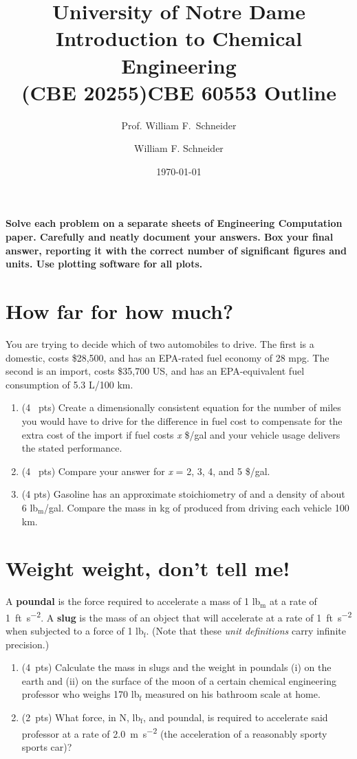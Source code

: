 \documentclass[11pt]{article}
\title{University of Notre Dame\\Introduction to Chemical Engineering\\(CBE 20255)}
\author{Prof. William F.\ Schneider}
\author{William F. Schneider}
\date{\today}
\title{CBE 60553 Outline}
\begin{document}
\begin{options}
\end{options}

\noindent \textbf{Solve each problem on a separate sheets of Engineering Computation paper.  Carefully and neatly document your answers. Box your final answer, reporting it with the correct number of significant figures and units.  Use plotting software for all plots.}


\section{How far for how much?}
\label{sec-1}
You are trying to decide which of two automobiles to drive.  The first is a
   domestic, costs \$28,500, and has an EPA-rated fuel economy of 28 mpg.  The
   second is an import, costs \$35,700 US, and has an EPA-equivalent fuel
   consumption of 5.3 L/100 km.

\begin{enumerate}
\item (4~ pts) Create a dimensionally consistent equation for the number of miles you would
have to drive for the difference in fuel cost to compensate for the extra
cost of the import if fuel costs \emph{x} \$/gal and your vehicle usage delivers the stated performance.

\item (4~ pts) Compare your answer for \emph{x} = 2, 3, 4, and 5 \$/gal.

\item (4\nbsb{} pts) Gasoline has an approximate stoichiometry of  and a density of about 6 lb$_{\text{m}}$/gal.  Compare the mass in kg of  produced from driving each vehicle 100 km.
\end{enumerate}

\section{Weight weight, don't tell me!}
\label{sec-2}
A \textbf{poundal} is the force required to accelerate a mass of 1 lb$_{\text{m}}$ at a rate of \SI{1}{ft\per\s\squared}.  A \textbf{slug} is the mass of an object that will accelerate at a rate of \SI{1}{ft\per\s\squared} when subjected to a force of 1 lb$_{\text{f}}$.  (Note that these \emph{unit definitions} carry infinite precision.)
\begin{enumerate}
\item (4~pts) Calculate the mass in slugs and the weight in poundals (i) on the earth and (ii) on the surface of the moon of a certain chemical engineering professor who weighs 170 lb$_{\text{f}}$ measured on his bathroom scale at home.

\item (2~pts) What force, in N, lb$_{\text{f}}$, and poundal, is required to accelerate said professor at a rate of \SI{2.0}{\meter\per\second\squared} (the acceleration of a reasonably sporty sports car)?
\end{enumerate}
\end{document}
